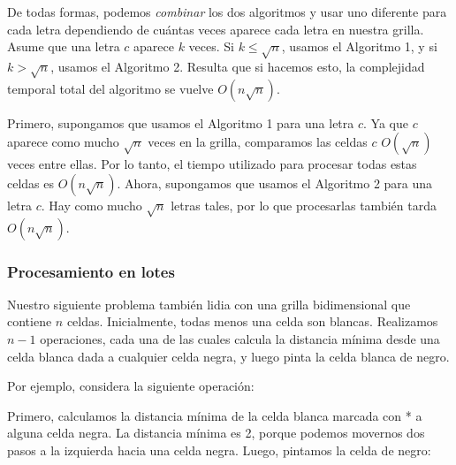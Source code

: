 De todas formas, podemos \emph{combinar} los dos algoritmos y usar uno
diferente para cada letra dependiendo de cuántas veces aparece cada letra
en nuestra grilla. Asume que una letra $c$ aparece $k$ veces. Si
$k \le \sqrt n$, usamos el Algoritmo 1, y si $k > \sqrt n$, usamos el
Algoritmo 2. Resulta que si hacemos esto, la complejidad temporal total
del algoritmo se vuelve $O(n \sqrt n)$.

Primero, supongamos que usamos el Algoritmo 1 para una letra $c$. Ya que
$c$ aparece como mucho $\sqrt n$ veces en la grilla, comparamos las celdas
$c$ $O(\sqrt n)$ veces entre ellas. Por lo tanto, el tiempo
utilizado para procesar todas estas celdas es $O(n \sqrt n)$. Ahora,
supongamos que usamos el Algoritmo 2 para una letra $c$. Hay como mucho
$\sqrt n$ letras tales, por lo que procesarlas también tarda $O(n \sqrt n)$.

\subsubsection{Procesamiento en lotes}

Nuestro siguiente problema también lidia con una grilla bidimensional
que contiene $n$ celdas. Inicialmente, todas menos una celda son blancas.
Realizamos $n-1$ operaciones, cada una de las cuales calcula la
distancia mínima desde una celda blanca dada a cualquier celda negra,
y luego pinta la celda blanca de negro.

Por ejemplo, considera la siguiente operación:

\begin{center}
\end{center}

Primero, calculamos la distancia mínima de la celda blanca marcada con *
a alguna celda negra. La distancia mínima es 2, porque podemos movernos dos
pasos a la izquierda hacia una celda negra. Luego, pintamos la celda
de negro:

\begin{center}
\end{center}

